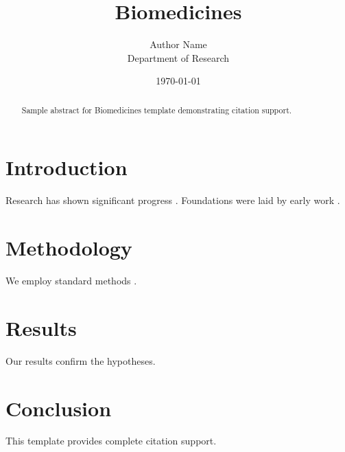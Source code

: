 \documentclass{mdpi}
\title{Biomedicines}
\author{Author Name \\ \small Department of Research}
\date{\today}
\begin{document}
\maketitle

\begin{abstract}
Sample abstract for Biomedicines template demonstrating citation support.
\end{abstract}

\section{Introduction}
Research has shown significant progress \citep{einstein1905}. Foundations were laid by early work \citep{turing1950}.

\section{Methodology}
We employ standard methods \citep{knuth1984}.

\section{Results}
Our results confirm the hypotheses.

\section{Conclusion}
This template provides complete citation support.



\end{document}
